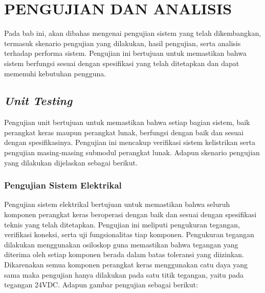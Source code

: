 

\chapter{PENGUJIAN DAN ANALISIS}
\label{chap:pengujiananalisis}

Pada bab ini, akan dibahas mengenai pengujian sistem yang telah dikembangkan,
termasuk skenario pengujian yang dilakukan, hasil pengujian, serta analisis
terhadap performa sistem. Pengujian ini bertujuan untuk memastikan bahwa sistem berfungsi
sesuai dengan spesifikasi yang telah ditetapkan dan dapat memenuhi kebutuhan pengguna.

\section{\emph{Unit Testing}}
Pengujian unit bertujuan untuk memastikan bahwa setiap bagian sistem, baik
perangkat keras maupun perangkat lunak, berfungsi dengan baik dan sesuai dengan spesifikasinya.
Pengujian ini mencakup verifikasi sistem kelistrikan serta pengujian masing-masing
submodul perangkat lunak. Adapun skenario pengujian yang dilakukan dijelaskan sebagai
berikut.

\subsection{Pengujian Sistem Elektrikal}
Pengujian sistem elektrikal bertujuan untuk memastikan bahwa seluruh komponen perangkat
keras beroperasi dengan baik dan sesuai dengan spesifikasi teknis yang telah ditetapkan.
Pengujian ini meliputi pengukuran tegangan, verifikasi koneksi, serta uji
fungsionalitas tiap komponen. Pengukuran tegangan dilakukan menggunakan osiloskop
guna memastikan bahwa tegangan yang diterima oleh setiap komponen berada dalam batas
toleransi yang diizinkan. Dikarenakan semua komponen perangkat keras menggunakan
catu daya yang sama maka pengujian hanya dilakukan pada satu titik tegangan, yaitu
pada tegangan 24VDC. Adapun gambar pengujian sebagai berikut:

